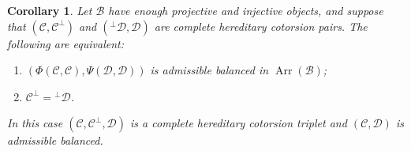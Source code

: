 \documentclass[11pt]{amsart}
\newtheorem{corollary}[theorem]{Corollary}
\theoremstyle{definition}
\theoremstyle{remark}
\theoremstyle{plain}
\numberwithin{equation}{section}
\begin{document}
\begin{corollary}\label{cor:arrows}
Let $\mathcal{B}$ have enough projective and injective objects, and suppose that
$(\mathcal{C}, \mathcal{C}^\perp)$ and $({}^\perp\mathcal{D}, \mathcal{D})$ are complete hereditary cotorsion
pairs. The following are equivalent:
\begin{enumerate}
 \item $(\Phi(\mathcal{C}, \mathcal{C}), \Psi(\mathcal{D}, \mathcal{D}))$ is admissible balanced in
 $\operatorname{Arr}(\mathcal{B})$;
 \item $\mathcal{C}^\perp = {}^\perp\mathcal{D}$.
\end{enumerate}
In this case $(\mathcal{C}, \mathcal{C}^\perp, \mathcal{D})$ is a complete hereditary cotorsion
triplet and $(\mathcal{C}, \mathcal{D})$ is admissible balanced.
\end{corollary}
\end{document}
